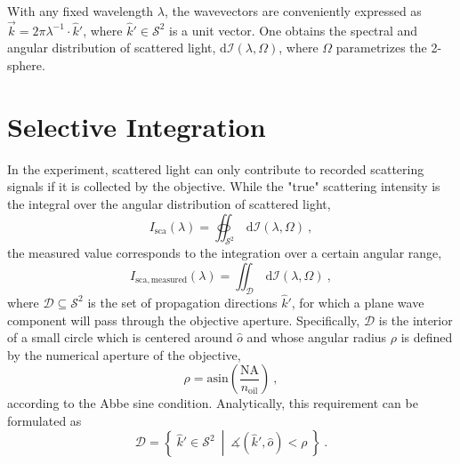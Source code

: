 \documentclass[10pt]{article}
\begin{document}
With any fixed wavelength $\lambda$, the wavevectors are conveniently expressed as $ \vec{k} = 2 \pi \lambda^{-1} \cdot \hat{k}'$, where \mbox{$\hat{k}' \in \mathcal{S}^2$} is a unit vector. 
One obtains the spectral and angular distribution of scattered light, $\mathrm{d}\mathcal{I}(\lambda, \Omega)$, where $\Omega$ parametrizes the 2-sphere. 







\section*{Selective Integration}


In the experiment, scattered light can only contribute to recorded scattering signals if it is collected by the objective. 
While the "true" scattering intensity is the integral over the angular distribution of scattered light, 
$$
    I_\mathrm{sca}(\lambda) = \oiint_{\mathcal{S}^2} \,\mathrm{d}\mathcal{I}(\lambda, \Omega) \ , %
$$
the measured value corresponds to the integration over a certain angular range, %
$$
    I_\mathrm{sca,measured}(\lambda) = \iint_{\mathcal{D}} \,\mathrm{d}\mathcal{I}(\lambda, \Omega) \ , 
$$
where $\mathcal{D} \subseteq \mathcal{S}^2$ is the set of propagation directions $\hat{k}'$, for which a plane wave component will pass through the objective aperture. %
Specifically, $\mathcal{D}$ is the interior of a small circle which is centered around $\hat{o}$ and whose angular radius $\rho$ is defined by the numerical aperture of the objective, 
$$
    \rho = \mathrm{asin}\!\left( \frac{\mathrm{NA}}{n_\mathrm{oil}} \right) \ ,
$$
according to the Abbe sine condition. \cite{MONA-BFP-photonic-crystals,MONA-BFP-photonic-stop-bands} 
Analytically, this requirement can be formulated as 
$$
    \mathcal{D} = \left\lbrace\ \hat{k}' \in \mathcal{S}^2\ \middle\vert\ \measuredangle\!\left( \hat{k}', \hat{o}\right) < \rho\ \right\rbrace
    \ .
$$
\end{document}

